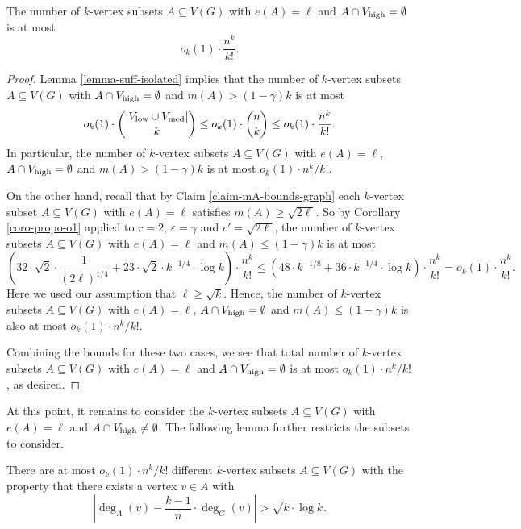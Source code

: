\begin{corollary}\label{coro-no-Vh}The number of $k$-vertex subsets $A\subseteq V(G)$ with $e(A)=\ell$ and $A\cap V_{\textnormal{high}}=\emptyset$ is at most
\[o_k(1)\cdot \frac{n^k}{k!}.\]
\end{corollary}
\begin{proof}Lemma \ref{lemma-suff-isolated} implies that the number of $k$-vertex subsets $A\subseteq V(G)$ with $A\cap V_{\textnormal{high}}=\emptyset$ and $m(A)>(1-\gamma)k$ is at most
\[o_k(1)\cdot {\vert V_{\textnormal{low}}\cup V_{\textnormal{med}}\vert\choose k}\leq o_k(1)\cdot {n\choose k}\leq o_k(1)\cdot \frac{n^k}{k!}.\]
In particular, the number of $k$-vertex subsets $A\subseteq V(G)$ with $e(A)=\ell$, $A\cap V_{\textnormal{high}}=\emptyset$ and $m(A)>(1-\gamma)k$ is at most $o_k(1)\cdot n^k/k!$.

On the other hand, recall that by Claim \ref{claim-mA-bounds-graph} each $k$-vertex subset $A\subseteq V(G)$ with $e(A)=\ell$ satisfies $m(A)\geq \sqrt{2\ell}$. So by Corollary \ref{coro-propo-o1} applied to $r=2$, $\varepsilon=\gamma$ and $c'=\sqrt{2\ell}$, the number of $k$-vertex subsets $A\subseteq V(G)$ with $e(A)=\ell$ and $m(A)\leq (1-\gamma)k$ is at most
\[\left(32\cdot \sqrt{2}\cdot \frac{1}{(2\ell)^{1/4}}+23 \cdot \sqrt{2}\cdot k^{-1/4}\cdot \log k\right)\cdot \frac{n^k}{k!}\leq  \left(48\cdot k^{-1/8}+36\cdot k^{-1/4}\cdot \log k\right)\cdot \frac{n^k}{k!}=o_k(1)\cdot \frac{n^k}{k!}.\]
Here we used our assumption that $\ell\geq \sqrt{k}$. Hence, the number of $k$-vertex subsets $A\subseteq V(G)$ with $e(A)=\ell$, $A\cap V_{\textnormal{high}}=\emptyset$ and $m(A)\leq (1-\gamma)k$ is also at most $o_k(1)\cdot n^k/k!$.

Combining the bounds for these two cases, we see that total number of $k$-vertex subsets $A\subseteq V(G)$ with $e(A)=\ell$ and $A\cap V_{\textnormal{high}}=\emptyset$ is at most $o_k(1)\cdot n^k/k!$, as desired.
\end{proof}

At this point, it remains to consider the $k$-vertex subsets $A\subseteq V(G)$ with $e(A)=\ell$ and $A\cap V_{\textnormal{high}}\neq \emptyset$. The following lemma further restricts the subsets to consider.

\begin{lemma}\label{lemma-vertex-degree-off}There are at most $o_k(1)\cdot n^k/k!$ different $k$-vertex subsets $A\subseteq V(G)$ with the property that there exists a vertex $v\in A$ with
\[\left\vert\deg_A(v)-\frac{k-1}{n}\cdot \deg_G(v)\right\vert>\sqrt{k\cdot \log k}.\]
\end{lemma}

